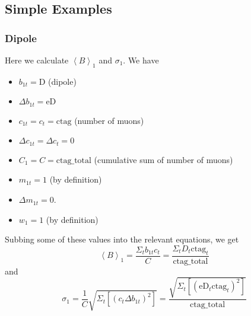 \documentclass[twoside]{article}
\begin{document}
\newpage
\subsection{Simple Examples}
\subsubsection{Dipole}
Here we calculate  $\left\langle B \right\rangle_1$ and $\sigma_1$. We have
\begin{itemize}
	\item $b_{1t} = \text{D}$ (dipole)
	\item $\Delta b_{1t} = \text{eD}$ 
	\item $c_{1t} = c_t = \text{ctag}$ (number of muons)
	\item $\Delta c_{1t} = \Delta c_t = 0$ 
	\item $C_{1} = C = \text{ctag\_total}$  (cumulative sum of number of muons)
	\item $m_{1t} = 1$  (by definition)
	\item $\Delta m_{1t} = 0$.
	\item $w_{1} = 1$ (by definition)
\end{itemize}
Subbing some of these values into the relevant equations, we get
\begin{equation}
		\left\langle B \right\rangle_1 =
		 \frac{\Sigma_{t} b_{1t} c_{t}}{C} = 
		  \frac{\Sigma_{t} D_t \text{ctag}_{t}}{\text{ctag\_total}}
\end{equation}
and 
\begin{equation}
	\sigma_{1} = \frac{1}{C}\sqrt{\Sigma_t  [(c_{t} \Delta b_{1t})^2 ]} = 
	\frac{\sqrt{\Sigma_t  [(\text{eD}_t \text{ctag}_t)^2 ]} }{\text{ctag\_total}}
\end{equation}
\end{document}

